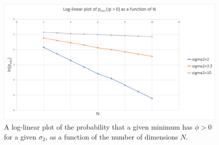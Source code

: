 \documentclass[12pt]{article}
\begin{document}

\begin{figure} 
  \centering
  \includegraphics[width=\linewidth]{Log-linear.png}
  \caption{A log-linear plot of the probability that a given minimum has $\phi > 0$ for a given $\sigma_2$, as a function of the number of dimensions $N$.}
  \label{Log-Linear}
\end{figure}


\end{document}

